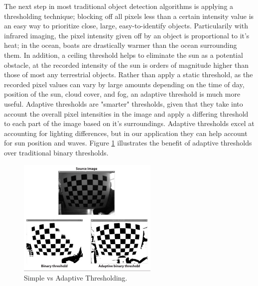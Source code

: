 The next step in most traditional object detection algorithms is applying a thresholding technique; blocking off all pixels less than a certain intensity value is an easy way to prioritize close, large, easy-to-identify objects. Particularily with infrared imaging, the pixel intensity given off by an object is proportional to it's heat; in the ocean, boats are drastically warmer than the ocean surrounding them. In addition, a ceiling threshold helps to eliminate the sun as a potential obstacle, at the recorded intensity of the sun is orders of magnitude higher than those of most any terrestrial objects. Rather than apply a static threshold, as the recorded pixel values can vary by large amounts depending on the time of day, position of the sun, cloud cover, and fog, an adaptive threshold is much more useful. Adaptive thresholds are "smarter" thresholds, given that they take into account the overall pixel intensities in the image and apply a differing threshold to each part of the image based on it's surroundings. Adaptive thresholds excel at accounting for lighting differences, but in our application they can help account for sun position and waves. Figure \ref{fig:thresh_comp} illustrates the benefit of adaptive thresholds over traditional binary thresholds.

\begin{figure}
\centering
\includegraphics[width=0.6\textwidth]{"./image/threshold_comparisons"}
\caption{Simple vs Adaptive Thresholding.}
\label{fig:thresh_comp}
\end{figure}


